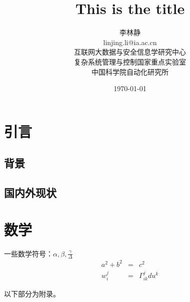 \documentclass[a4paper,12pt]{article}
\begin{document}
\title{This is the title}
\author{
	李林静\\
	linjing.li@ia.ac.cn\\
	互联网大数据与安全信息学研究中心\\
	复杂系统管理与控制国家重点实验室\\
	中国科学院自动化研究所
	}
\date{\today}

\maketitle

\section{引言}

\subsection{背景}

\subsection{国内外现状}


\section{数学}

一些数学符号：$\alpha,\beta,\frac{\gamma}{\Delta}$
\begin{eqnarray}
	a^2 + b^2 &=& c^2 \\
	w_i^j &=& \Gamma_{ik}^jdu^k
\end{eqnarray}


\appendix

以下部分为附录。
\end{document}
